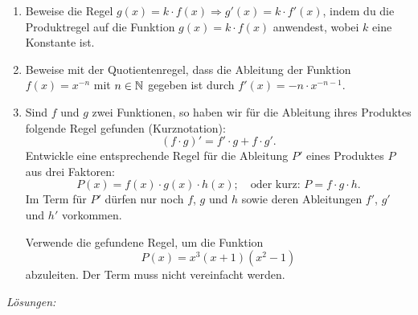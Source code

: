 \begin{ueb}
\begin{enumerate}
		\item Beweise die Regel \( g(x) = k \cdot f(x) \Rightarrow g'(x) = k \cdot f'(x)\), indem du die Produktregel auf die Funktion $g(x) = k \cdot f(x)$ anwendest, wobei $k$ eine Konstante ist.

		\item Beweise mit der Quotientenregel, dass die Ableitung der Funktion $f(x) = x^{-n}$ mit $n\in \mathbb{N}$ gegeben ist durch $f'(x) = -n\cdot x^{-n-1}$.

		\item Sind \( f \) und \( g \) zwei Funktionen, so haben wir für die Ableitung ihres Produktes folgende Regel gefunden (Kurznotation):
		      \[
			      (f \cdot g)' = f' \cdot g + f \cdot g'.
		      \]
		      Entwickle eine entsprechende Regel für die Ableitung \( P' \) eines Produktes \( P \) aus drei Faktoren:
		      \[
			      P(x) = f(x) \cdot g(x) \cdot h(x); \quad \text{oder kurz: } P = f \cdot g \cdot h.
		      \]
		      Im Term für \( P' \) dürfen nur noch \( f \), \( g \) und \( h \) sowie deren Ableitungen \( f' \), \( g' \) und \( h' \) vorkommen.

		      Verwende die gefundene Regel, um die Funktion
		      \[
			      P(x) = x^3(x + 1)(x^2 - 1)
		      \]
		      abzuleiten. Der Term muss nicht vereinfacht werden.



	\end{enumerate}
\end{ueb}
\clearpage
\emph{Lösungen:}

